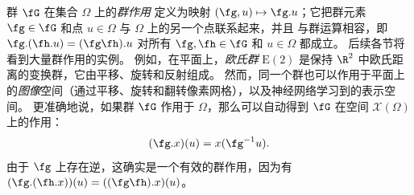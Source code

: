 群 $\fG$ 在集合 $\Omega$ 上的\emph{群作用}
定义为映射 $(\fg, u) \mapsto \fg.u$；它把群元素 $\fg \in \fG$ 和点 $u\in \Omega$ 与 $\Omega$ 上的另一个点联系起来，并且
与群运算相容，即 $\fg.(\fh.u) = (\fg \fh).u$ 对所有 $\fg, \fh \in \fG$ 和 $u \in \Omega$ 都成立。
%
后续各节将看到大量群作用的实例。
%
例如，在平面上，{\em 欧氏群} $\mathrm{E}(2)$ 是保持 $\R^2$ 中欧氏距离的变换群，它由平移、旋转和反射组成。
然而，同一个群也可以作用于平面上的\emph{图像}空间（通过平移、旋转和翻转像素网格），以及神经网络学习到的表示空间。
%
%
更准确地说，如果群 $\fG$ 作用于 $\Omega$，那么可以自动得到 $\fG$ 在空间 $\mathcal{X}(\Omega)$ 上的作用：
\begin{equation}
    (\fg . x)(u) = x(\fg^{-1} u).
    \label{eq:group_action}
\end{equation}
由于 $\fg$ 上存在逆，这确实是一个有效的群作用，因为有 $(\fg . (\fh . x))(u) = ((\fg \fh) . x)(u)$。%

%


